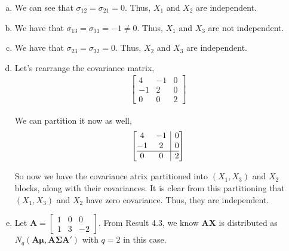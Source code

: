 \documentclass[12pt]{article}\usepackage[]{graphicx}\usepackage[]{color}
\newcommand{\vct}{\mathbf}
\begin{document}
\begin{enumerate}[a)]

\item We can see that $\sigma_{12} = \sigma_{21} = 0$. Thus, $X_1$ and $X_2$ are independent.

\item We have that $\sigma_{13} = \sigma_{31} = -1 \neq 0$. Thus, $X_1$ and $X_3$ are not independent.

\item We have that $\sigma_{23} = \sigma_{32} = 0$. Thus, $X_2$ and $X_3$ are independent.

\item Let's rearrange the covariance matrix,
\begin{align*}
\begin{bmatrix}
4 & -1 & 0\\
-1 & 2 & 0\\
0 & 0 & 2
\end{bmatrix}
\end{align*}

We can partition it now as well,
\begin{align*}
\left[\begin{array}{@{}cc|c@{}}
    4 & -1 & 0 \\
    -1 & 2 & 0 \\\hline
    0 & 0 & 2
  \end{array}\right]
\end{align*}

So now we have the covariance atrix partitioned into $(X_1, X_3)$ and $X_2$ blocks, along with their covariances. It is clear from this partitioning that $(X_1, X_3)$ and $X_2$ have zero covariance. Thus, they are independent.

\item Let $\vct{A} = \begin{bmatrix} 1 & 0 & 0 \\ 1 & 3 & -2\end{bmatrix}$. From Result 4.3, we know $\vct{A}\vct{X}$ is distributed as $N_q(\vct{A}\vct{\mu}, \vct{A}\vct{\Sigma}\vct{A}')$ with $q = 2$ in this case.


\end{enumerate}
\end{document}
